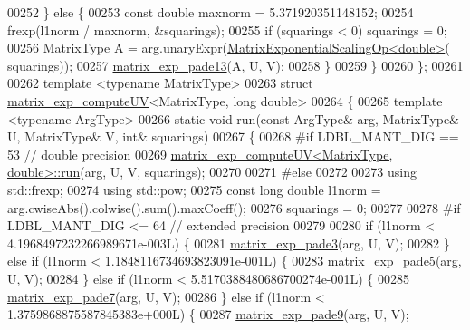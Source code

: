 \begin{DoxyCode}
00252     \} \textcolor{keywordflow}{else} \{
00253       \textcolor{keyword}{const} \textcolor{keywordtype}{double} maxnorm = 5.371920351148152;
00254       frexp(l1norm / maxnorm, &squarings);
00255       \textcolor{keywordflow}{if} (squarings < 0) squarings = 0;
00256       MatrixType A = arg.unaryExpr(\hyperlink{struct_eigen_1_1internal_1_1_matrix_exponential_scaling_op}{MatrixExponentialScalingOp<double>}(
      squarings));
00257       \hyperlink{namespace_eigen_1_1internal_ae7d0962a143c96343984440db683905a}{matrix\_exp\_pade13}(A, U, V);
00258     \}
00259   \}
00260 \};
00261   
00262 \textcolor{keyword}{template} <\textcolor{keyword}{typename} MatrixType>
00263 \textcolor{keyword}{struct }\hyperlink{struct_eigen_1_1internal_1_1matrix__exp__compute_u_v}{matrix\_exp\_computeUV}<MatrixType, long double>
00264 \{
00265   \textcolor{keyword}{template} <\textcolor{keyword}{typename} ArgType>
00266   \textcolor{keyword}{static} \textcolor{keywordtype}{void} run(\textcolor{keyword}{const} ArgType& arg, MatrixType& U, MatrixType& V, \textcolor{keywordtype}{int}& squarings)
00267   \{
00268 \textcolor{preprocessor}{#if   LDBL\_MANT\_DIG == 53   // double precision}
00269     \hyperlink{struct_eigen_1_1internal_1_1matrix__exp__compute_u_v_a7847531ae0fccc8ec7648f95846c8adb}{matrix\_exp\_computeUV<MatrixType, double>::run}(arg, U, V, 
      squarings);
00270   
00271 \textcolor{preprocessor}{#else}
00272   
00273     \textcolor{keyword}{using} std::frexp;
00274     \textcolor{keyword}{using} std::pow;
00275     \textcolor{keyword}{const} \textcolor{keywordtype}{long} \textcolor{keywordtype}{double} l1norm = arg.cwiseAbs().colwise().sum().maxCoeff();
00276     squarings = 0;
00277   
00278 \textcolor{preprocessor}{#if LDBL\_MANT\_DIG <= 64   // extended precision}
00279   
00280     \textcolor{keywordflow}{if} (l1norm < 4.1968497232266989671e-003L) \{
00281       \hyperlink{namespace_eigen_1_1internal_a7e6cf2e01b6fb376d33b9bb8183e5777}{matrix\_exp\_pade3}(arg, U, V);
00282     \} \textcolor{keywordflow}{else} \textcolor{keywordflow}{if} (l1norm < 1.1848116734693823091e-001L) \{
00283       \hyperlink{namespace_eigen_1_1internal_af4992d182490219270a24aaa8285e63a}{matrix\_exp\_pade5}(arg, U, V);
00284     \} \textcolor{keywordflow}{else} \textcolor{keywordflow}{if} (l1norm < 5.5170388480686700274e-001L) \{
00285       \hyperlink{namespace_eigen_1_1internal_a1abecb439e6cb1b5188828cdb7e0ab60}{matrix\_exp\_pade7}(arg, U, V);
00286     \} \textcolor{keywordflow}{else} \textcolor{keywordflow}{if} (l1norm < 1.3759868875587845383e+000L) \{
00287       \hyperlink{namespace_eigen_1_1internal_a218447e97bf869bf354f92e020a7355a}{matrix\_exp\_pade9}(arg, U, V);

\end{DoxyCode}
